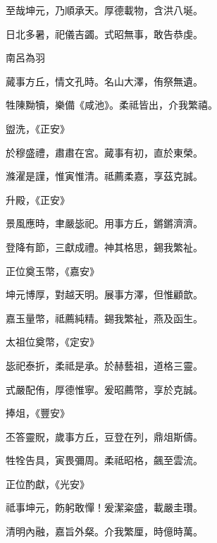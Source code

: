 \begin{pinyinscope}
 至哉坤元，乃順承天。厚德載物，含洪八埏。



 日北多暑，祀儀吉蠲。式昭無事，敢告恭虔。



 南呂為羽



 蕆事方丘，情文孔時。名山大澤，侑祭無遺。



 牲陳黝犢，樂備《咸池》。柔祗皆出，介我繁禧。



 盥洗，《正安》



 於穆盛禮，肅肅在宮。蕆事有初，直於東榮。



 滌濯是謹，惟寅惟清。祗薦柔嘉，享茲克誠。



 升殿，《正安》



 景風應時，聿嚴毖祀。用事方丘，鏘鏘濟濟。



 登降有節，三獻成禮。神其格思，錫我繁祉。



 正位奠玉幣，《嘉安》



 坤元博厚，對越天明。展事方澤，但惟顧歆。



 嘉玉量幣，祗薦純精。錫我繁祉，燕及函生。



 太祖位奠幣，《定安》



 毖祀泰折，柔祗是承。於赫藝祖，道格三靈。



 式嚴配侑，厚德惟寧。爰昭薦幣，享於克誠。



 捧俎，《豐安》



 丕答靈貺，歲事方丘，豆登在列，鼎俎斯儔。



 牲牷告具，寅畏彌周。柔祗昭格，飆至雲流。



 正位酌獻，《光安》



 祗事坤元，飭躬敢憚！爰潔粢盛，載嚴圭瓚。



 清明內融，嘉旨外粲。介我繁厘，時億時萬。




\end{pinyinscope}
